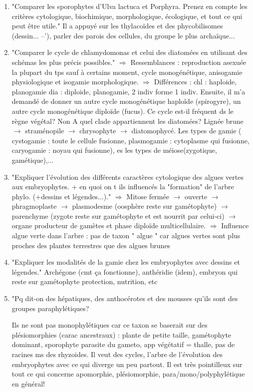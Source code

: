 \begin{enumerate}
	\item "Comparer les sporophytes d’Ulva lactuca et Porphyra. Prenez en compte les critères cytologique, biochimique, morphologique, écologique, et tout ce qui peut être utile." Il a appuyé sur les thylacoïdes et des phycobilisomes (dessin... --'), parler des parois des cellules, du groupe le plus archaïque...

	\item "Comparer le cycle de chlamydomonas et celui des diatomées en utilisant des schémas les plus précis possibles."
 $\Rightarrow$ Ressemblances : reproduction asexuée la plupart du tps sauf à certains moment, cycle monogénétique, anisogamie physiologique et isogamie morphologique.
 $\Rightarrow$ Différences : chl : haploide, planogamie dia : diploide, planogamie, 2 indiv forme 1 indiv. 
Ensuite, il m'a demandé de donner un autre cycle monogénétique haploîde (spirogyre), un autre cycle monogénétique diploïde (fucus). 
Ce cycle est-il fréquent ds le règne végétal? Non
 A quel clade appartiennent les diatomées? Lignée brune  $\rightarrow$ straménopile $\rightarrow$ chrysophyte $\rightarrow$ diatomophycé. Les types de gamie ( cystogamie : toute le cellule fusionne, plasmogamie : cytoplasme qui fusionne, caryogamie : noyau qui fusionne),  es les types de méiose(zygotique, gamétique),...

	\item "Expliquer l'évolution des différents caractères  cytologique des algues vertes aux embryophytes. + en quoi on t ils influencés la "formation" de l'arbre phylo. (+dessins et légendes...)."
$\Rightarrow$ Mitose fermée $\rightarrow$ ouverte $\rightarrow$ phragmoplaste $\rightarrow$ plasmodesme (oosphère reste sur gamétophyte) $\rightarrow$ parenchyme (zygote reste sur gamétophyte et est nourrit par celui-ci) $\rightarrow$ organe producteur de gamètes et phase diploïde multicellulaire.
$\Rightarrow$ Influence algue verte dans l’arbre : pas de taxon " algue " car algues vertes sont plus proches des plantes terrestres que des algues brunes

	\item "Expliquer les modalités de la gamie chez les embryophytes avec dessins et légendes." Archégone (cmt ça fonctionne), anthéridie (idem), embryon qui reste sur gamétophyte protection, nutrition, etc

	\item "Pq dit-on des hépatiques, des anthocérotes et des mousses qu'ils sont des groupes paraphylétiques?

Ils ne sont pas monophylétiques car ce taxon se baserait sur des plésiomorphies (carac ancestraux) : plante de petite taille, gamétophyte dominant, sporophyte parasite du gameto, app végétatif = thalle, pas de racines ms des rhyzoides. Il veut des cycles, l'arbre de l'évolution des embryophytes avec ce qui diverge un peu partout. Il est très pointilleux sur tout ce qui concerne apomorphie, plésiomorphie, para/mono/polyphylétique en général!


\end{enumerate}
